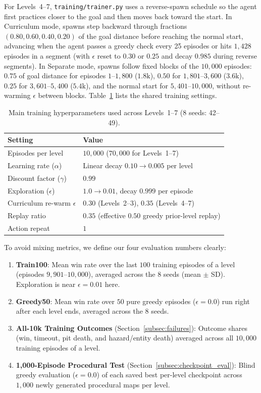 For Levels~4--7, \texttt{training/trainer.py} uses a reverse-spawn schedule so the agent first practices closer to the goal and then moves back toward the start. In Curriculum mode, spawns step backward through fractions $(0.80, 0.60, 0.40, 0.20)$ of the goal distance before reaching the normal start, advancing when the agent passes a greedy check every 25 episodes or hits $1{,}428$ episodes in a segment (with $\epsilon$ reset to $0.30$ or $0.25$ and decay $0.985$ during reverse segments). In Separate mode, spawns follow fixed blocks of the $10{,}000$ episodes: $0.75$ of goal distance for episodes $1$--$1{,}800$ ($1.8\text{k}$), $0.50$ for $1{,}801$--$3{,}600$ ($3.6\text{k}$), $0.25$ for $3{,}601$--$5{,}400$ ($5.4\text{k}$), and the normal start for $5{,}401$--$10{,}000$, without re-warming $\epsilon$ between blocks. Table~\ref{tab:hyperparams} lists the shared training settings.

\begin{table}[t]
\caption{Main training hyperparameters used across Levels~1--7 (8 seeds: 42--49).}
\label{tab:hyperparams}
\centering
\begin{tabular}{ll}
\toprule
\textbf{Setting} & \textbf{Value} \\
\midrule
Episodes per level & $10{,}000$ ($70{,}000$ for Levels~1--7) \\
Learning rate ($\alpha$) & Linear decay $0.10 \to 0.005$ per level \\
Discount factor ($\gamma$) & $0.99$ \\
Exploration ($\epsilon$) & $1.0 \to 0.01$, decay $0.999$ per episode \\
Curriculum re-warm $\epsilon$ & $0.30$ (Levels~2--3), $0.35$ (Levels~4--7) \\
Replay ratio & $0.35$ (effective $0.50$ greedy prior-level replay) \\
Action repeat & $1$ \\
\bottomrule
\end{tabular}
\end{table}

To avoid mixing metrics, we define our four evaluation numbers clearly:
\begin{enumerate}
    \item \textbf{Train100}: Mean win rate over the last $100$ training episodes of a level (episodes $9{,}901$--$10{,}000$), averaged across the $8$ seeds (mean $\pm$ SD). Exploration is near $\epsilon = 0.01$ here.
    \item \textbf{Greedy50}: Mean win rate over $50$ pure greedy episodes ($\epsilon = 0.0$) run right after each level ends, averaged across the $8$ seeds.
    \item \textbf{All-10k Training Outcomes} (Section~\ref{subsec:failures}): Outcome shares (win, timeout, pit death, and hazard/entity death) averaged across all $10{,}000$ training episodes of a level.
    \item \textbf{1,000-Episode Procedural Test} (Section~\ref{subsec:checkpoint_eval}): Blind greedy evaluation ($\epsilon = 0.0$) of each saved best per-level checkpoint across $1{,}000$ newly generated procedural maps per level.
\end{enumerate}

